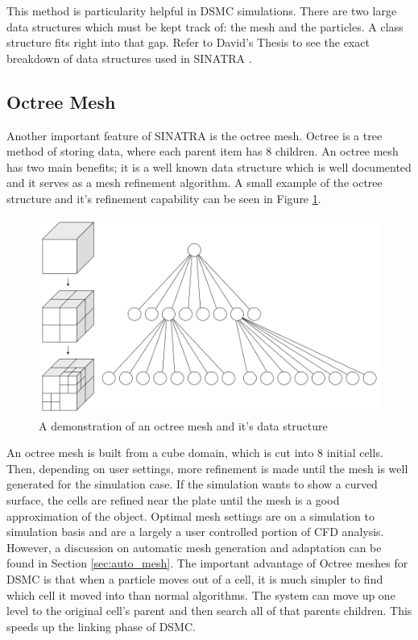 \indent This method is particularity helpful in DSMC simulations. There are two large data structures which must be kept track of: the mesh and the particles. A class structure fits right into that gap. Refer to David's Thesis to see the exact breakdown of data structures used in SINATRA \cite{Galvez2018a}. \par

\subsection{Octree Mesh}
\label{sec:octree}

Another important feature of SINATRA is the octree mesh. Octree is a tree method of storing data, where each parent item has 8 children. An octree mesh has two main benefits; it is a well known data structure which is well documented and it serves as a mesh refinement algorithm. A small example of the octree structure and it's refinement capability can be seen in Figure \ref{fig:octree}. \par


\begin{figure}
    \centering
    \includegraphics[width=.7\textwidth]{figures/octree.png}
    \caption{A demonstration of an octree mesh and it's data structure  \cite{octree}}
    \label{fig:octree}
\end{figure}


\indent An octree mesh is built from a cube domain, which is cut into 8 initial cells. Then, depending on user settings, more refinement is made until the mesh is well generated for the simulation case. If the simulation wants to show a curved surface, the cells are refined near the plate until the mesh is a good approximation of the object. Optimal mesh settings are on a simulation to simulation basis and are a largely a user controlled portion of CFD analysis. However, a discussion on automatic mesh generation and adaptation can be found in Section \ref{sec:auto_mesh}. The important advantage of Octree meshes for DSMC is that when a particle moves out of a cell, it is much simpler to find which cell it moved into than normal algorithms. The system can move up one level to the original cell's parent and then search all of that parents children. This speeds up the linking phase of DSMC. \par




